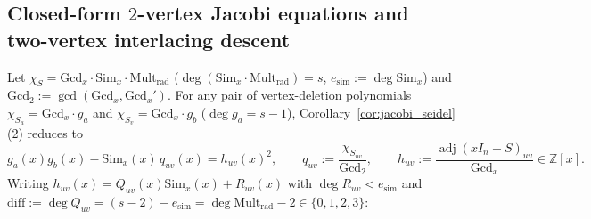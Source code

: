 \documentclass[11pt,reqno]{amsart}
\theoremstyle{definition}
\theoremstyle{remark}
\numberwithin{equation}{section}
\numberwithin{table}{section}
\DeclareMathOperator{\adj}{adj}
\begin{document}
\subsection{Closed-form \texorpdfstring{$2$}{2}-vertex Jacobi equations and two-vertex interlacing descent}
Let $\chi_S = \mathrm{Gcd}_x \cdot \mathrm{Sim}_x \cdot \mathrm{Mult}_{\mathrm{rad}}$ ($\deg(\mathrm{Sim}_x \cdot \mathrm{Mult}_{\mathrm{rad}}) = s$, $e_{\mathrm{sim}} := \deg\mathrm{Sim}_x$) and $\mathrm{Gcd}_2 := \gcd(\mathrm{Gcd}_x, \mathrm{Gcd}_x')$. For any pair of vertex-deletion polynomials $\chi_{S_u} = \mathrm{Gcd}_x \cdot g_a$ and $\chi_{S_v} = \mathrm{Gcd}_x \cdot g_b$ ($\deg g_a = s - 1$), Corollary~\ref{cor:jacobi_seidel}(2) reduces to
\begin{equation}\label{eq:reduced_2v}
  g_a(x) g_b(x) - \mathrm{Sim}_x(x)\,q_{uv}(x) = h_{uv}(x)^2, \qquad q_{uv} := \frac{\chi_{S_{uv}}}{\mathrm{Gcd}_2}, \qquad h_{uv} := \frac{\adj(xI_n - S)_{uv}}{\mathrm{Gcd}_x} \in \mathbb{Z}[x].
\end{equation}
Writing $h_{uv}(x) = Q_{uv}(x)\mathrm{Sim}_x(x) + R_{uv}(x)$ with $\deg R_{uv} < e_{\mathrm{sim}}$ and $\mathrm{diff} := \deg Q_{uv} = (s - 2) - e_{\mathrm{sim}} = \deg\mathrm{Mult}_{\mathrm{rad}} - 2 \in \{0, 1, 2, 3\}$:
\end{document}
